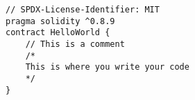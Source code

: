 \begin{lstlisting}[language=Solidity]
// SPDX-License-Identifier: MIT
pragma solidity ^0.8.9
contract HelloWorld {
	// This is a comment
	/* 
	This is where you write your code
	*/	
}
\end{lstlisting}